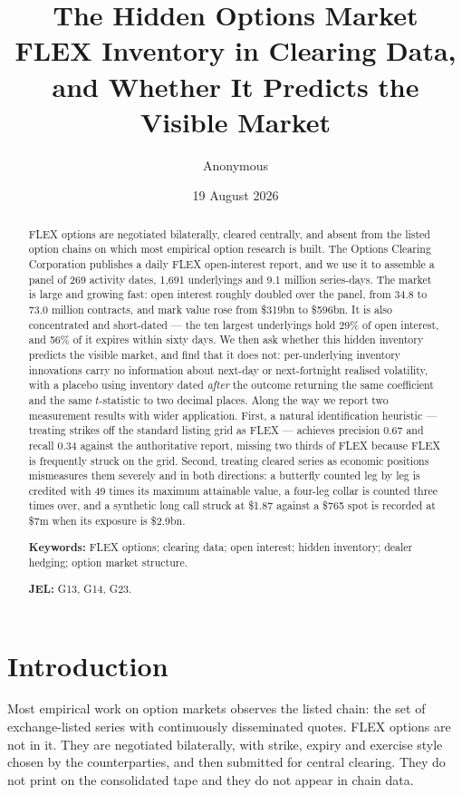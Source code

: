 \documentclass[11pt]{article}
\title{\textbf{The Hidden Options Market}\\[0.4em]
\large FLEX Inventory in Clearing Data, and Whether It Predicts the Visible Market}
\author{Anonymous}
\date{19 August 2026}
\begin{document}
\maketitle

\begin{abstract}
\noindent
FLEX options are negotiated bilaterally, cleared centrally, and absent from the listed
option chains on which most empirical option research is built. The Options Clearing
Corporation publishes a daily FLEX open-interest report, and we use it to assemble a
panel of 269 activity dates, 1,691 underlyings and 9.1 million series-days. The market
is large and growing fast: open interest roughly doubled over the panel, from 34.8 to
73.0 million contracts, and mark value rose from \$319bn to \$596bn. It is also
concentrated and short-dated --- the ten largest underlyings hold 29\% of open
interest, and 56\% of it expires within sixty days. We then ask whether this hidden
inventory predicts the visible market, and find that it does not: per-underlying
inventory innovations carry no information about next-day or next-fortnight realised
volatility, with a placebo using inventory dated \emph{after} the outcome returning the
same coefficient and the same $t$-statistic to two decimal places. Along the way we
report two measurement results with wider application. First, a natural
identification heuristic --- treating strikes off the standard listing grid as FLEX ---
achieves precision $0.67$ and recall $0.34$ against the authoritative report, missing
two thirds of FLEX because FLEX is frequently struck on the grid. Second, treating
cleared series as economic positions mismeasures them severely and in both directions:
a butterfly counted leg by leg is credited with 49 times its maximum attainable value,
a four-leg collar is counted three times over, and a synthetic long call struck at
\$1.87 against a \$765 spot is recorded at \$7m when its exposure is \$2.9bn.

\vspace{0.8em}
\noindent\textbf{Keywords:} FLEX options; clearing data; open interest; hidden
inventory; dealer hedging; option market structure.

\noindent\textbf{JEL:} G13, G14, G23.
\end{abstract}

\section{Introduction}

Most empirical work on option markets observes the listed chain: the set of
exchange-listed series with continuously disseminated quotes. FLEX options are not in
it. They are negotiated bilaterally, with strike, expiry and exercise style chosen by
the counterparties, and then submitted for central clearing. They do not print on the
consolidated tape and they do not appear in chain data.
\end{document}
